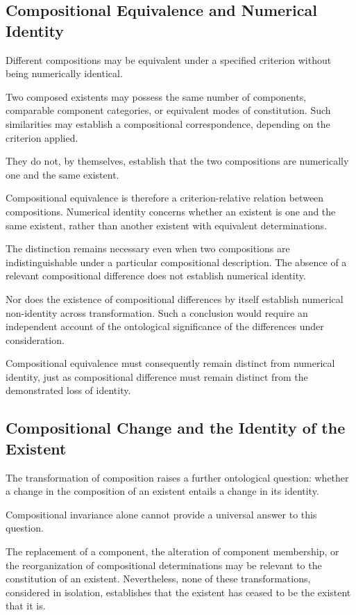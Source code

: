 \subsection{Compositional Equivalence and Numerical Identity}

Different compositions may be equivalent under a specified
criterion without being numerically identical.

Two composed existents may possess the same number of
components, comparable component categories, or equivalent
modes of constitution. Such similarities may establish
a compositional correspondence, depending on the criterion
applied.

They do not, by themselves, establish that the two
compositions are numerically one and the same existent.

Compositional equivalence is therefore a criterion-relative
relation between compositions. Numerical identity concerns
whether an existent is one and the same existent, rather
than another existent with equivalent determinations.

The distinction remains necessary even when two compositions
are indistinguishable under a particular compositional
description. The absence of a relevant compositional
difference does not establish numerical identity.

Nor does the existence of compositional differences
by itself establish numerical non-identity across
transformation. Such a conclusion would require an
independent account of the ontological significance
of the differences under consideration.

Compositional equivalence must consequently remain
distinct from numerical identity, just as compositional
difference must remain distinct from the demonstrated
loss of identity.

\subsection{Compositional Change and the Identity of the Existent}

The transformation of composition raises a further
ontological question: whether a change in the composition
of an existent entails a change in its identity.

Compositional invariance alone cannot provide a universal
answer to this question.

The replacement of a component, the alteration of component
membership, or the reorganization of compositional
determinations may be relevant to the constitution
of an existent. Nevertheless, none of these transformations,
considered in isolation, establishes that the existent
has ceased to be the existent that it is.

